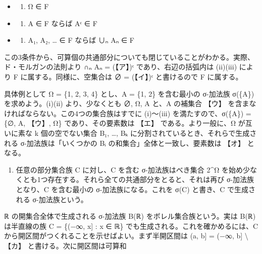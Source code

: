 \documentclass[
  10pt,
  a4paper,
]{article}
\providecommand{\tightlist}{%
  \setlength{\itemsep}{0pt}\setlength{\parskip}{0pt}}
\begin{document}
\begin{itemize}
\item
  \begin{enumerate}
  \def\labelenumi{(\roman{enumi})}
  \tightlist
  \item
    Ω ∈ F
  \end{enumerate}
\item
  \begin{enumerate}
  \def\labelenumi{(\roman{enumi})}
  \setcounter{enumi}{1}
  \tightlist
  \item
    A ∈ F ならば A{\fallbackfont ᶜ} ∈ F
  \end{enumerate}
\item
  \begin{enumerate}
  \def\labelenumi{(\roman{enumi})}
  \setcounter{enumi}{2}
  \tightlist
  \item
    A{\fallbackfont ₁}, A{\fallbackfont ₂}, \ldots{} ∈ F ならば
    ∪{\fallbackfont ₙ} A{\fallbackfont ₙ} ∈ F
  \end{enumerate}
\end{itemize}

この3条件から、可算個の共通部分についても閉じていることがわかる。実際、ド・モルガンの法則より
∩{\fallbackfont ₙ} A{\fallbackfont ₙ} = (【ア】){\fallbackfont ᶜ}
であり、右辺の括弧内は (ii)(iii) により F に属する。同様に、空集合は ∅ =
(【イ】){\fallbackfont ᶜ} と書けるので F に属する。

具体例として Ω = \{1, 2, 3, 4\} とし、A = \{1, 2\} を含む最小の σ-加法族
σ(\{A\}) を求めよう。(i)(ii) より、少なくとも ∅, Ω, A と、A の補集合
【ウ】 を含まなければならない。この4つの集合族はすでに (i)〜(iii)
を満たすので、σ(\{A\}) = \{∅, A, 【ウ】, Ω\} であり、その要素数は 【エ】
である。より一般に、Ω が互いに素な k 個の空でない集合
B{\fallbackfont ₁}, \ldots, B{\fallbackfont ₖ}
に分割されているとき、それらで生成される σ-加法族は「いくつかの
B{\fallbackfont ᵢ} の和集合」全体と一致し、要素数は 【オ】 となる。

\begin{enumerate}
\def\labelenumi{(\arabic{enumi})}
\setcounter{enumi}{1}
\tightlist
\item
  任意の部分集合族 C に対し、C を含む σ-加法族はべき集合 2\^{}Ω
  を始め少なくとも1つ存在する。それら全ての共通部分をとると、それは再び
  σ-加法族となり、C を含む最小の σ-加法族になる。これを σ(C) と書き、C
  で生成される σ-加法族という。
\end{enumerate}

{\fallbackfont ℝ} の開集合全体で生成される σ-加法族 B({\fallbackfont ℝ})
をボレル集合族という。実は B({\fallbackfont ℝ}) は半直線の族 C = \{(−∞,
x{]} : x ∈ {\fallbackfont ℝ}\} でも生成される。これを確かめるには、C
から開区間がつくれることを示せばよい。まず半開区間は (a, b{]} = (−∞,
b{]} \textbackslash{} 【カ】 と書ける。次に開区間は可算和
\end{document}
